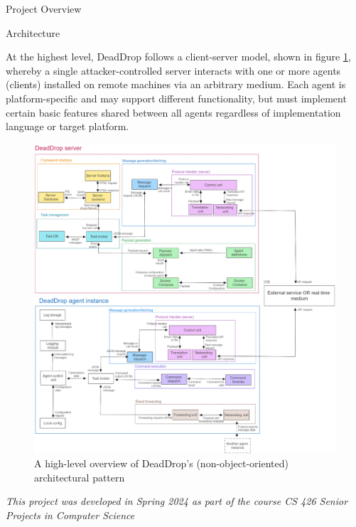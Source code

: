 \documentclass[final]{beamer}
\newlength{\colwidth}
\begin{document}
\begin{frame}[t]
\begin{columns}[t]
\begin{column}{\colwidth}
\begin{block}{Project Overview}
  \end{block}

  \begin{block}{Architecture}

    At the highest level, DeadDrop follows a client-server model, shown in figure \ref{fig:arch}, whereby a single attacker-controlled server interacts with one or more agents (clients) installed on remote machines via an arbitrary medium. 
    Each agent is platform-specific and may support different functionality, but must implement certain basic features shared between all agents regardless of implementation language or target platform. 

    \begin{figure}
      \centering
      \includegraphics[width=\textwidth]{images/architecture.png}
      \caption{\quad A high-level overview of DeadDrop’s (non-object-oriented) architectural pattern}
      \label{fig:arch}
    \end{figure}

  \end{block}
  \begin{block}{}
    
    \it{This project was developed in Spring 2024 as part of the course CS 426 Senior Projects in Computer Science}


\end{block}
\end{column}
\end{columns}
\end{frame}
\end{document}
